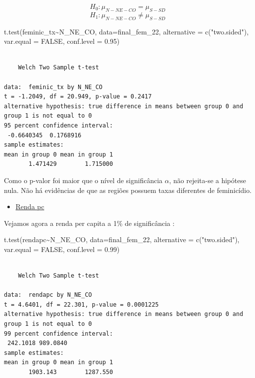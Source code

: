 \documentclass[
  letterpaper,
  DIV=11,
  numbers=noendperiod]{scrreprt}
\newenvironment{Shaded}{\begin{snugshade}}{\end{snugshade}}
\newcommand{\AttributeTok}[1]{\textcolor[rgb]{0.40,0.45,0.13}{#1}}
\newcommand{\ConstantTok}[1]{\textcolor[rgb]{0.56,0.35,0.01}{#1}}
\newcommand{\FloatTok}[1]{\textcolor[rgb]{0.68,0.00,0.00}{#1}}
\newcommand{\FunctionTok}[1]{\textcolor[rgb]{0.28,0.35,0.67}{#1}}
\newcommand{\NormalTok}[1]{\textcolor[rgb]{0.00,0.23,0.31}{#1}}
\newcommand{\SpecialCharTok}[1]{\textcolor[rgb]{0.37,0.37,0.37}{#1}}
\newcommand{\StringTok}[1]{\textcolor[rgb]{0.13,0.47,0.30}{#1}}
\providecommand{\tightlist}{%
  \setlength{\itemsep}{0pt}\setlength{\parskip}{0pt}}
\begin{document}
\[H_0: \mu_{N-NE-CO} = \mu_{S-SD}\]
\[H_1: \mu_{N-NE-CO} \neq \mu_{S-SD}\]

\begin{Shaded}
\begin{Highlighting}[]
\FunctionTok{t.test}\NormalTok{(feminic\_tx}\SpecialCharTok{\textasciitilde{}}\NormalTok{N\_NE\_CO, }\AttributeTok{data=}\NormalTok{final\_fem\_22,}
       \AttributeTok{alternative =} \FunctionTok{c}\NormalTok{(}\StringTok{"two.sided"}\NormalTok{),}
       \AttributeTok{var.equal =} \ConstantTok{FALSE}\NormalTok{,}
       \AttributeTok{conf.level =} \FloatTok{0.95}\NormalTok{)}
\end{Highlighting}
\end{Shaded}

\begin{verbatim}

    Welch Two Sample t-test

data:  feminic_tx by N_NE_CO
t = -1.2049, df = 20.949, p-value = 0.2417
alternative hypothesis: true difference in means between group 0 and group 1 is not equal to 0
95 percent confidence interval:
 -0.6640345  0.1768916
sample estimates:
mean in group 0 mean in group 1 
       1.471429        1.715000 
\end{verbatim}

Como o p-valor foi maior que o nível de significância \(\alpha\), não
rejeita-se a hipótese nula. Não há evidências de que as regiões possuem
taxas diferentes de feminicídio.

\begin{itemize}
\tightlist
\item
  \ul{Renda pc}
\end{itemize}

Vejamos agora a renda per capita a 1\% de significância :

\begin{Shaded}
\begin{Highlighting}[]
\FunctionTok{t.test}\NormalTok{(rendapc}\SpecialCharTok{\textasciitilde{}}\NormalTok{N\_NE\_CO, }\AttributeTok{data=}\NormalTok{final\_fem\_22,}
       \AttributeTok{alternative =} \FunctionTok{c}\NormalTok{(}\StringTok{"two.sided"}\NormalTok{),}
       \AttributeTok{var.equal =} \ConstantTok{FALSE}\NormalTok{,}
       \AttributeTok{conf.level =} \FloatTok{0.99}\NormalTok{) }
\end{Highlighting}
\end{Shaded}

\begin{verbatim}

    Welch Two Sample t-test

data:  rendapc by N_NE_CO
t = 4.6401, df = 22.301, p-value = 0.0001225
alternative hypothesis: true difference in means between group 0 and group 1 is not equal to 0
99 percent confidence interval:
 242.1018 989.0840
sample estimates:
mean in group 0 mean in group 1 
       1903.143        1287.550 
\end{verbatim}
\end{document}

